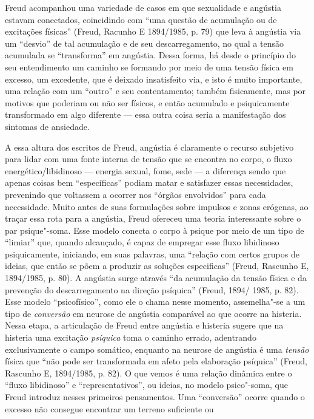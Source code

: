 Freud acompanhou uma variedade de casos em que sexualidade e angústia
estavam conectados, coincidindo com ``uma questão de acumulação ou de
excitações físicas'' (Freud, Racunho E 1894/1985, p. 79) que leva à
angústia via um ``desvio'' de tal acumulação e de seu descarregamento,
no qual a tensão acumulada se ``transforma'' em angústia. Dessa forma,
há desde o princípio do seu entendimento um caminho se formando por meio
de uma tensão física em excesso, um excedente, que é deixado
insatisfeito via, e isto é muito importante, uma relação com um
``outro'' e seu contentamento; também fisicamente, mas por motivos que
poderiam ou não ser físicos, e então acumulado e psiquicamente
transformado em algo diferente --- essa outra coisa seria a manifestação
dos sintomas de ansiedade.

A essa altura dos escritos de Freud, angústia é claramente o recurso
subjetivo para lidar com uma fonte interna de tensão que se encontra no
corpo, o fluxo energético/libidinoso --- energia sexual, fome, sede --- a
diferença sendo que apenas coisas bem ``específicas'' podiam matar e
satisfazer essas necessidades, prevenindo que voltassem a ocorrer nos
``órgãos envolvidos'' para cada necessidade. Muito antes de suas
formulações sobre impulsos e zonas erógenas, ao traçar essa rota para a
angústia, Freud ofereceu uma teoria interessante sobre o par
psique"-soma. Esse modelo conecta o corpo à psique por meio de um tipo de
``limiar'' que, quando alcançado, é capaz de empregar esse fluxo
libidinoso psiquicamente, iniciando, em suas palavras, uma ``relação com
certos grupos de ideias, que então se põem a produzir as soluções
especificas'' (Freud, Rascunho E, 1894/1985, p. 80). A angústia surge
através ``da acumulação da tensão física e da prevenção do
descarregamento na direção psíquica'' (Freud, 1894/ 1985, p. 82). Esse
modelo ``psicofísico'', como ele o chama nesse momento, assemelha"-se a
um tipo de \emph{conversão} em neurose de angústia comparável ao que
ocorre na histeria. Nessa etapa, a articulação de Freud entre angústia e
histeria sugere que na histeria uma excitação \emph{psíquica} toma o
caminho errado, adentrando exclusivamente o campo somático, enquanto na
neurose de angústia é uma \emph{tensão} física que ``não pode ser
transformada em afeto pela elaboração psíquica'' (Freud, Rascunho E,
1894/1985, p. 82). O que vemos é uma relação dinâmica entre o ``fluxo
libidinoso'' e ``representativos'', ou ideias, no modelo psico"-soma,
que Freud introduz nesses primeiros pensamentos. Uma ``conversão''
ocorre quando o excesso não consegue encontrar um terreno suficiente ou

